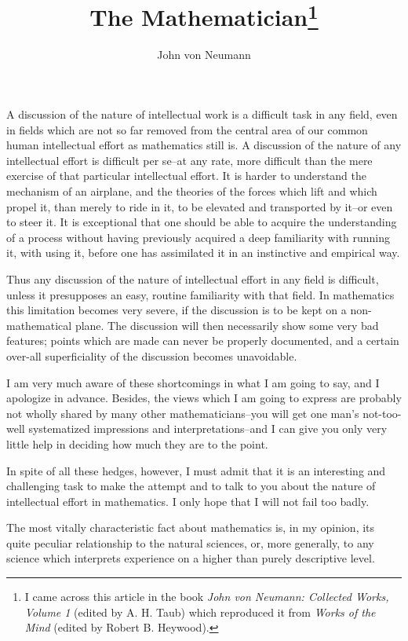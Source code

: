 \documentclass{article}
\title{The Mathematician\footnote{I came across this article in the book \textit{John von Neumann: Collected Works, Volume 1} (edited by A. H. Taub) which reproduced it from \textit{Works of the Mind} (edited by Robert B. Heywood).}}
\author{John von Neumann}
\date{}
\begin{document}
\maketitle

A discussion of the nature of intellectual work is a difficult task in any field, even in fields which are not so far removed from the central area of our common human intellectual effort as mathematics still is. A discussion of the nature of any intellectual effort is difficult per se--at any rate, more difficult than the mere exercise of that particular intellectual effort. It is harder to understand the mechanism of an airplane, and the theories of the forces which lift and which propel it, than merely to ride in it, to be elevated and transported by it--or even to steer it. It is exceptional that one should be able to acquire the understanding of a process without having previously acquired a deep familiarity with running it, with using it, before one has assimilated it in an instinctive and empirical way.

Thus any discussion of the nature of intellectual effort in any field is difficult, unless it presupposes an easy, routine familiarity with that field. In mathematics this limitation becomes very severe, if the discussion is to be kept on a non-mathematical plane. The discussion will then necessarily show some very bad features; points which are made can never be properly documented, and a certain over-all superficiality of the discussion becomes unavoidable.

I am very much aware of these shortcomings in what I am going to say, and I apologize in advance. Besides, the views which I am going to express are probably not wholly shared by many other mathematicians--you will get one man's not-too-well systematized impressions and interpretations--and I can give you only very little help in deciding how much they are to the point.

In spite of all these hedges, however, I must admit that it is an interesting and challenging task to make the attempt and to talk to you about the nature of intellectual effort in mathematics. I only hope that I will not fail too badly.

The most vitally characteristic fact about mathematics is, in my opinion, its quite peculiar relationship to the natural sciences, or, more generally, to any science which interprets experience on a higher than purely descriptive level.
\end{document}
